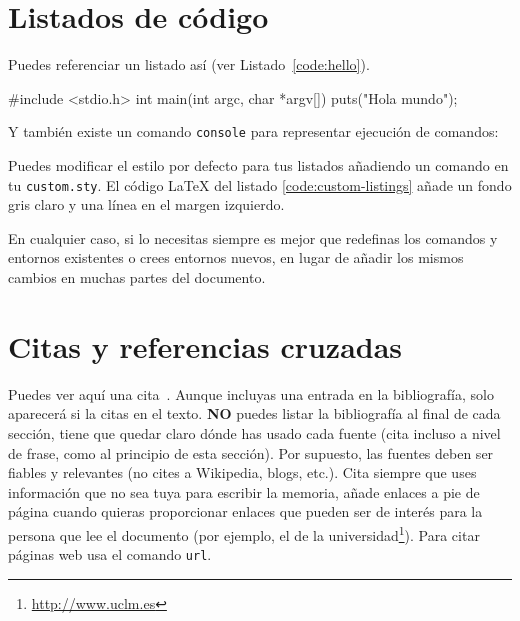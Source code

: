 \begin{table}[hp]
  \centering
  {\small
  
  }
  \caption[Semánticas de \acs{RPC} en presencia de distintos fallos]{Semánticas de \acs{RPC} en presencia de distintos fallos (\textsc{Puder}~\cite{puder05:_distr_system_archit})}
  \label{tab:rpc-semantics}
\end{table}


\section{Listados de código}
\label{sec:listado}

Puedes referenciar un listado así (ver Listado~\ref{code:hello}).

\begin{listing}[
  float=ht,
  language = C,
  caption  = {«Hola mundo» en C},
  label    = code:hello]
#include <stdio.h>
int main(int argc, char *argv[]) {
    puts("Hola mundo\n");
}
\end{listing}

Y también existe un comando \texttt{console} para representar ejecución de comandos:


Puedes modificar el estilo por defecto para tus listados añadiendo un comando  en tu \texttt{custom.sty}. El código \LaTeX{} del listado \ref{code:custom-listings} añade un fondo gris claro y una línea en el margen izquierdo.

\begin{listing}[
  float=h!,
  caption  = {Personalizando los listados de código},
  label    = code:custom-listings]
\end{listing}

En cualquier caso, si lo necesitas siempre es mejor que redefinas los comandos y entornos existentes o crees entornos nuevos, en lugar de añadir los mismos cambios en muchas partes del documento.


\section{Citas y referencias cruzadas}

Puedes ver aquí una cita~\cite{design_patterns}. Aunque incluyas una entrada en la bibliografía, solo aparecerá si la citas en el texto. \textbf{NO} puedes listar la bibliografía al final de cada sección, tiene que quedar claro dónde has usado cada fuente (cita incluso a nivel de frase, como al principio de esta sección). Por supuesto, las fuentes deben ser fiables y relevantes (no cites a Wikipedia, blogs, etc.). Cita siempre que uses información que no sea tuya para escribir la memoria, añade enlaces a pie de página cuando quieras proporcionar enlaces que pueden ser de interés para la persona que lee el documento (por ejemplo, el de la universidad\footnote{\url{http://www.uclm.es}}). Para citar páginas web usa el comando \texttt{url}.

